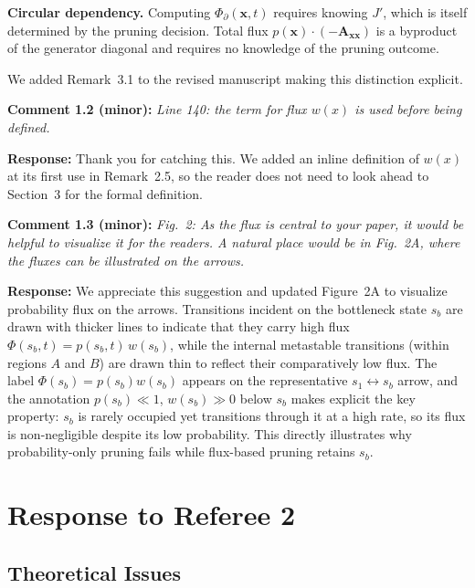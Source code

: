 \documentclass[11pt]{article}
\begin{document}
\textbf{Circular dependency.}
Computing $\Phi_{\partial}(\boldsymbol{x},t)$ requires knowing $J'$, which is itself determined by the pruning decision.
Total flux $p(\boldsymbol{x})\cdot(-\mathbf{A}_{\boldsymbol{x}\boldsymbol{x}})$ is a byproduct of the generator diagonal and requires no knowledge of the pruning outcome.

We added Remark~3.1 to the revised manuscript making this distinction explicit.

\medskip

\noindent\textbf{Comment 1.2 (minor):} \textit{Line 140: the term for flux
$w(x)$ is used before being defined.}

\textbf{Response:} Thank you for catching this.  We added an inline definition
of $w(x)$ at its first use in Remark~2.5, so the reader does not need to look
ahead to Section~3 for the formal definition.

\medskip

\noindent\textbf{Comment 1.3 (minor):} \textit{Fig.\ 2: As the flux is central
to your paper, it would be helpful to visualize it for the readers. A natural
place would be in Fig.\ 2A, where the fluxes can be illustrated on the arrows.}

\textbf{Response:} We appreciate this suggestion and updated Figure~2A to
visualize probability flux on the arrows.
Transitions incident on the bottleneck state $s_b$ are drawn with thicker lines to indicate that they carry high flux $\Phi(s_b,t)=p(s_b,t)\,w(s_b)$, while the internal metastable transitions (within regions $A$ and $B$) are drawn thin to reflect their comparatively low flux.
The label $\Phi(s_b)=p(s_b)w(s_b)$ appears on the representative $s_1\leftrightarrow s_b$ arrow, and the annotation $p(s_b)\!\ll\!1$, $w(s_b)\!\gg\!0$ below $s_b$ makes explicit the key property: $s_b$ is rarely occupied yet transitions through it at a high rate, so its flux is non-negligible despite its low probability.
This directly illustrates why probability-only pruning fails while flux-based pruning retains $s_b$.

\section*{Response to Referee 2}

\subsection*{Theoretical Issues}
\end{document}
